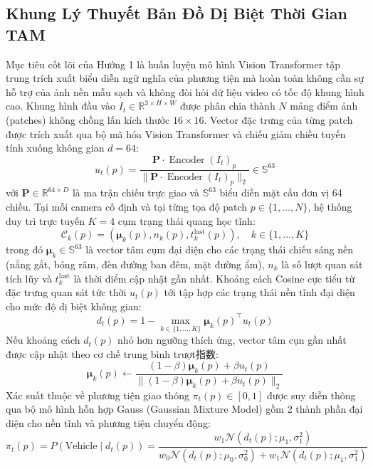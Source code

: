 \documentclass[11pt,a4paper]{article}
\begin{document}
\subsection{Khung Lý Thuyết Bản Đồ Dị Biệt Thời Gian TAM}
Mục tiêu cốt lõi của Hướng 1 là huấn luyện mô hình Vision Transformer tập trung trích xuất biểu diễn ngữ nghĩa của phương tiện mà hoàn toàn không cần sự hỗ trợ của ảnh nền mẫu sạch và không đòi hỏi dữ liệu video có tốc độ khung hình cao.
Khung hình đầu vào $I_t \in \mathbb{R}^{3 \times H \times W}$ được phân chia thành $N$ mảng điểm ảnh (patches) không chồng lấn kích thước $16 \times 16$. Vector đặc trưng của từng patch được trích xuất qua bộ mã hóa Vision Transformer và chiếu giảm chiều tuyến tính xuống không gian $d = 64$:
\begin{equation}
    u_t(p) = \frac{\mathbf{P} \cdot \operatorname{Encoder}(I_t)_p}{\|\mathbf{P} \cdot \operatorname{Encoder}(I_t)_p\|_2} \in \mathbb{S}^{63}
\end{equation}
với $\mathbf{P} \in \mathbb{R}^{64 \times D}$ là ma trận chiếu trực giao và $\mathbb{S}^{63}$ biểu diễn mặt cầu đơn vị 64 chiều. Tại mỗi camera cố định và tại từng tọa độ patch $p \in \{1, \dots, N\}$, hệ thống duy trì trực tuyến $K = 4$ cụm trạng thái quang học tĩnh:
\begin{equation}
    \mathcal{C}_k(p) = \left( \bm{\mu}_k(p), n_k(p), t_k^{\text{last}}(p) \right), \quad k \in \{1, \dots, K\}
\end{equation}
trong đó $\bm{\mu}_k \in \mathbb{S}^{63}$ là vector tâm cụm đại diện cho các trạng thái chiếu sáng nền (nắng gắt, bóng râm, đèn đường ban đêm, mặt đường ẩm), $n_k$ là số lượt quan sát tích lũy và $t_k^{\text{last}}$ là thời điểm cập nhật gần nhất.
Khoảng cách Cosine cực tiểu từ đặc trưng quan sát tức thời $u_t(p)$ tới tập hợp các trạng thái nền tĩnh đại diện cho mức độ dị biệt không gian:
\begin{equation}
    d_t(p) = 1 - \max_{k \in \{1, \dots, K\}} \bm{\mu}_k(p)^\top u_t(p)
\end{equation}
Nếu khoảng cách $d_t(p)$ nhỏ hơn ngưỡng thích ứng, vector tâm cụn gần nhất được cập nhật theo cơ chế trung bình trượt指数:
\begin{equation}
    \bm{\mu}_k(p) \leftarrow \frac{(1 - \beta)\bm{\mu}_k(p) + \beta u_t(p)}{\|(1 - \beta)\bm{\mu}_k(p) + \beta u_t(p)\|_2}
\end{equation}
Xác suất thuộc về phương tiện giao thông $\pi_t(p) \in [0, 1]$ được suy diễn thông qua bộ mô hình hỗn hợp Gauss (Gaussian Mixture Model) gồm 2 thành phần đại diện cho nền tĩnh và phương tiện chuyển động:
\begin{equation}
    \pi_t(p) = P(\text{Vehicle} \mid d_t(p)) = \frac{w_1 \mathcal{N}(d_t(p); \mu_1, \sigma_1^2)}{w_0 \mathcal{N}(d_t(p); \mu_0, \sigma_0^2) + w_1 \mathcal{N}(d_t(p); \mu_1, \sigma_1^2)}
\end{equation}
\end{document}
